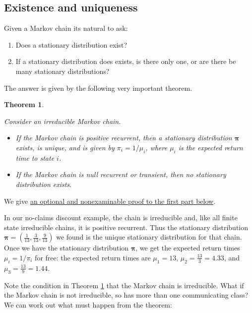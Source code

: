 \documentclass[
  a4paper,
]{article}
\providecommand{\tightlist}{%
  \setlength{\itemsep}{0pt}\setlength{\parskip}{0pt}}
\newtheorem{theorem}{Theorem}[section]
\theoremstyle{definition}
\theoremstyle{definition}
\theoremstyle{definition}
\theoremstyle{remark}
\begin{document}
\hypertarget{exist-unique}{%
\subsection{Existence and uniqueness}\label{exist-unique}}

Given a Markov chain its natural to ask:

\begin{enumerate}
\def\labelenumi{\arabic{enumi}.}
\tightlist
\item
  Does a stationary distribution exist?
\item
  If a stationary distribution does exists, is there only one, or are there be many stationary distributions?
\end{enumerate}

The answer is given by the following very important theorem.

\begin{theorem}
\protect\hypertarget{thm:statex}{}\label{thm:statex}

Consider an irreducible Markov chain.

\begin{itemize}
\tightlist
\item
  If the Markov chain is positive recurrent, then a stationary distribution \(\boldsymbol \pi\) exists, is unique, and is given by \(\pi_i = 1/\mu_{i}\), where \(\mu_{i}\) is the expected return time to state \(i\).
\item
  If the Markov chain is null recurrent or transient, then no stationary distribution exists.
\end{itemize}

\end{theorem}

We give \protect\hyperlink{stat-proof}{an optional and nonexaminable proof to the first part below}.

In our no-claims discount example, the chain is irreducible and, like all finite state irreducible chains, it is positive recurrent. Thus the stationary distribution \(\boldsymbol\pi = (\tfrac{1}{13}, \tfrac{3}{13}, \tfrac{9}{13})\) we found is the unique stationary distribution for that chain.
Once we have the stationary distribution \(\boldsymbol\pi\), we get the expected return times \(\mu_i = 1/\pi_i\) for free: the expected return times are \(\mu_1 = 13\), \(\mu_2 = \frac{13}{3} = 4.33\), and \(\mu_3 = \frac{13}{9} = 1.44\).

Note the condition in Theorem \ref{thm:statex} that the Markov chain is irreducible. What if the Markov chain is not irreducible, so has more than one communicating class? We can work out what must happen from the theorem:
\end{document}
